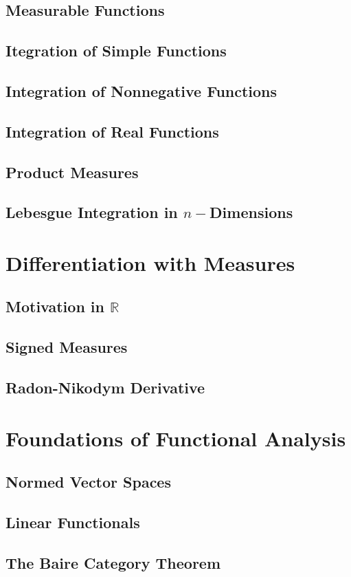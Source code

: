 \documentclass{article}
\newcommand{\R}{\mathbb{R}}
\theoremstyle{definition}
\begin{document}
\subsection{Measurable Functions}
\subsection{Itegration of Simple Functions}
\subsection{Integration of Nonnegative Functions}
\subsection{Integration of Real Functions}
\subsection{Product Measures}
\subsection{Lebesgue Integration in $ n- $Dimensions}
\section{Differentiation with Measures}
\subsection{Motivation in $ \R $}
\subsection{Signed Measures}
\subsection{Radon-Nikodym Derivative}
\section{Foundations of Functional Analysis}
\subsection{Normed Vector Spaces}
\subsection{Linear Functionals}
\subsection{The Baire Category Theorem}
\end{document}
